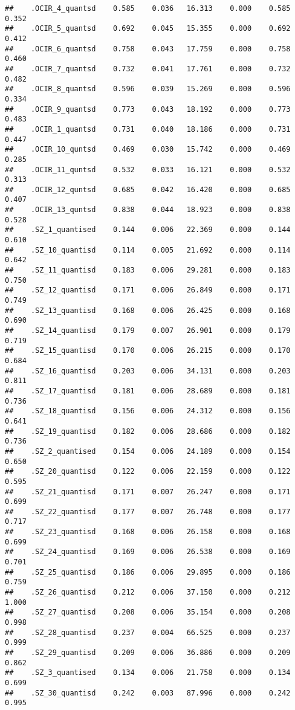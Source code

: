 \documentclass[]{article}
\begin{document}
\begin{verbatim}
##    .OCIR_4_quantsd    0.585    0.036   16.313    0.000    0.585    0.352
##    .OCIR_5_quantsd    0.692    0.045   15.355    0.000    0.692    0.412
##    .OCIR_6_quantsd    0.758    0.043   17.759    0.000    0.758    0.460
##    .OCIR_7_quantsd    0.732    0.041   17.761    0.000    0.732    0.482
##    .OCIR_8_quantsd    0.596    0.039   15.269    0.000    0.596    0.334
##    .OCIR_9_quantsd    0.773    0.043   18.192    0.000    0.773    0.483
##    .OCIR_1_quantsd    0.731    0.040   18.186    0.000    0.731    0.447
##    .OCIR_10_quntsd    0.469    0.030   15.742    0.000    0.469    0.285
##    .OCIR_11_quntsd    0.532    0.033   16.121    0.000    0.532    0.313
##    .OCIR_12_quntsd    0.685    0.042   16.420    0.000    0.685    0.407
##    .OCIR_13_quntsd    0.838    0.044   18.923    0.000    0.838    0.528
##    .SZ_1_quantised    0.144    0.006   22.369    0.000    0.144    0.610
##    .SZ_10_quantisd    0.114    0.005   21.692    0.000    0.114    0.642
##    .SZ_11_quantisd    0.183    0.006   29.281    0.000    0.183    0.750
##    .SZ_12_quantisd    0.171    0.006   26.849    0.000    0.171    0.749
##    .SZ_13_quantisd    0.168    0.006   26.425    0.000    0.168    0.690
##    .SZ_14_quantisd    0.179    0.007   26.901    0.000    0.179    0.719
##    .SZ_15_quantisd    0.170    0.006   26.215    0.000    0.170    0.684
##    .SZ_16_quantisd    0.203    0.006   34.131    0.000    0.203    0.811
##    .SZ_17_quantisd    0.181    0.006   28.689    0.000    0.181    0.736
##    .SZ_18_quantisd    0.156    0.006   24.312    0.000    0.156    0.641
##    .SZ_19_quantisd    0.182    0.006   28.686    0.000    0.182    0.736
##    .SZ_2_quantised    0.154    0.006   24.189    0.000    0.154    0.650
##    .SZ_20_quantisd    0.122    0.006   22.159    0.000    0.122    0.595
##    .SZ_21_quantisd    0.171    0.007   26.247    0.000    0.171    0.699
##    .SZ_22_quantisd    0.177    0.007   26.748    0.000    0.177    0.717
##    .SZ_23_quantisd    0.168    0.006   26.158    0.000    0.168    0.699
##    .SZ_24_quantisd    0.169    0.006   26.538    0.000    0.169    0.701
##    .SZ_25_quantisd    0.186    0.006   29.895    0.000    0.186    0.759
##    .SZ_26_quantisd    0.212    0.006   37.150    0.000    0.212    1.000
##    .SZ_27_quantisd    0.208    0.006   35.154    0.000    0.208    0.998
##    .SZ_28_quantisd    0.237    0.004   66.525    0.000    0.237    0.999
##    .SZ_29_quantisd    0.209    0.006   36.886    0.000    0.209    0.862
##    .SZ_3_quantised    0.134    0.006   21.758    0.000    0.134    0.699
##    .SZ_30_quantisd    0.242    0.003   87.996    0.000    0.242    0.995

\end{verbatim}
\end{document}
